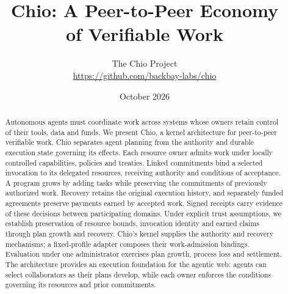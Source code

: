 \documentclass[11pt]{article}
\title{\vspace{-2em}\textbf{Chio: A Peer-to-Peer Economy\\of Verifiable Work}}
\author{The Chio Project\\\small\url{https://github.com/backbay-labs/chio}}
\date{October 2026}
\begin{document}
\maketitle
\begin{abstract}
Autonomous agents must coordinate work across systems whose owners retain
control of their tools, data and funds. We present Chio, a kernel architecture
for peer-to-peer verifiable work. Chio separates agent planning from the
authority and durable execution state governing its effects. Each resource
owner admits work under locally controlled capabilities, policies and treaties.
Linked commitments bind a selected invocation to its delegated resources,
receiving authority and conditions of acceptance. A program grows by adding
tasks while preserving the commitments of previously authorized work. Recovery
retains the original execution history, and separately funded agreements
preserve payments earned by accepted work. Signed receipts carry evidence of
these decisions between participating domains. Under explicit trust assumptions,
we establish preservation of resource bounds, invocation identity and earned
claims through plan growth and recovery. Chio's kernel supplies the authority
and recovery mechanisms; a fixed-profile adapter composes their work-admission
bindings. Evaluation under one administrator exercises plan growth, process
loss and settlement. The architecture provides an execution foundation for the
agentic web: agents can select collaborators as their plans
develop, while each owner enforces the conditions governing its resources and
prior commitments.
\end{abstract}









\clearpage
{\raggedright


\par}
\clearpage
\appendix


\end{document}
